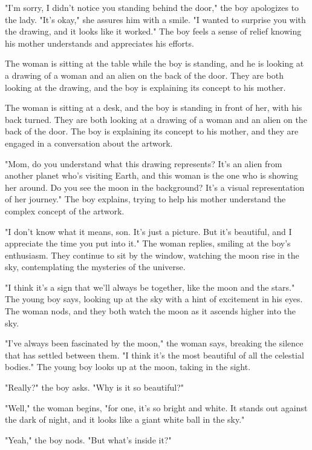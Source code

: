 \documentclass[smalldemyvopaper,11pt,twoside,onecolumn,openright,extrafontsizes]{memoir}
\begin{document}
"I'm sorry, I didn't notice you standing behind the door," the boy apologizes to the lady. "It's okay," she assures him with a smile. "I wanted to surprise you with the drawing, and it looks like it worked." The boy feels a sense of relief knowing his mother understands and appreciates his efforts.\par
The woman is sitting at the table while the boy is standing, and he is looking at a drawing of a woman and an alien on the back of the door. They are both looking at the drawing, and the boy is explaining its concept to his mother.\par
The woman is sitting at a desk, and the boy is standing in front of her, with his back turned. They are both looking at a drawing of a woman and an alien on the back of the door. The boy is explaining its concept to his mother, and they are engaged in a conversation about the artwork.\par
"Mom, do you understand what this drawing represents? It's an alien from another planet who's visiting Earth, and this woman is the one who is showing her around. Do you see the moon in the background? It's a visual representation of her journey." The boy explains, trying to help his mother understand the complex concept of the artwork.\par
"I don't know what it means, son. It's just a picture. But it's beautiful, and I appreciate the time you put into it." The woman replies, smiling at the boy's enthusiasm. They continue to sit by the window, watching the moon rise in the sky, contemplating the mysteries of the universe.\par
"I think it's a sign that we'll always be together, like the moon and the stars." The young boy says, looking up at the sky with a hint of excitement in his eyes. The woman nods, and they both watch the moon as it ascends higher into the sky.\par
"I've always been fascinated by the moon," the woman says, breaking the silence that has settled between them. "I think it's the most beautiful of all the celestial bodies." The young boy looks up at the moon, taking in the sight.\par
"Really?" the boy asks. "Why is it so beautiful?"\par
"Well," the woman begins, "for one, it's so bright and white. It stands out against the dark of night, and it looks like a giant white ball in the sky."\par
"Yeah," the boy nods. "But what's inside it?"\par
\end{document}
